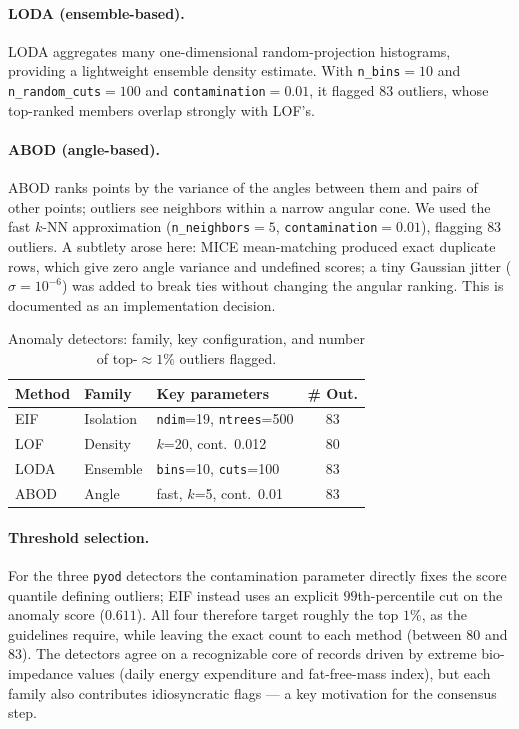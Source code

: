 \paragraph{LODA (ensemble-based).} LODA \cite{loda} aggregates many one-dimensional random-projection histograms, providing a lightweight ensemble density estimate. With \texttt{n\_bins}$=10$ and \texttt{n\_random\_cuts}$=100$ and \texttt{contamination}$=0.01$, it flagged $83$ outliers, whose top-ranked members overlap strongly with LOF's.

\paragraph{ABOD (angle-based).} ABOD \cite{abod} ranks points by the variance of the angles between them and pairs of other points; outliers see neighbors within a narrow angular cone. We used the fast $k$-NN approximation (\texttt{n\_neighbors}$=5$, \texttt{contamination}$=0.01$), flagging $83$ outliers. A subtlety arose here: MICE mean-matching produced exact duplicate rows, which give zero angle variance and undefined scores; a tiny Gaussian jitter ($\sigma=10^{-6}$) was added to break ties without changing the angular ranking. This is documented as an implementation decision.

\begin{table}[H]
\centering
\small
\caption{Anomaly detectors: family, key configuration, and number of top-$\approx1\%$ outliers flagged.}
\label{tab:cmi_outliers}
\begin{tabular}{l l l c}
\hline
Method & Family & Key parameters & \# Out. \\
\hline
EIF  & Isolation & \texttt{ndim}=19, \texttt{ntrees}=500 & 83 \\
LOF  & Density   & $k$=20, cont.\ 0.012 & 80 \\
LODA & Ensemble  & \texttt{bins}=10, \texttt{cuts}=100 & 83 \\
ABOD & Angle     & fast, $k$=5, cont.\ 0.01 & 83 \\
\hline
\end{tabular}
\end{table}

\paragraph{Threshold selection.} For the three \texttt{pyod} detectors the contamination parameter directly fixes the score quantile defining outliers; EIF instead uses an explicit $99$th-percentile cut on the anomaly score ($0.611$). All four therefore target roughly the top $1\%$, as the guidelines require, while leaving the exact count to each method (between $80$ and $83$). The detectors agree on a recognizable core of records driven by extreme bio-impedance values (daily energy expenditure and fat-free-mass index), but each family also contributes idiosyncratic flags --- a key motivation for the consensus step.

